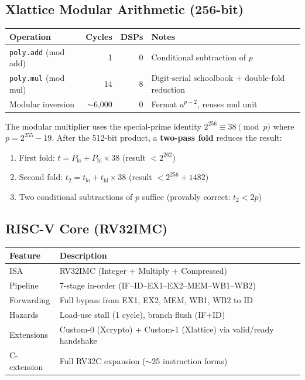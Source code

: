 \documentclass[11pt,a4paper]{article}
\begin{document}
\subsection{Xlattice Modular Arithmetic (256-bit)}

\begin{center}
\begin{tabular}{@{}lrrp{5cm}@{}}
\toprule
\textbf{Operation} & \textbf{Cycles} & \textbf{DSPs} & \textbf{Notes} \\
\midrule
\texttt{poly.add} (mod add) & 1 & 0 & Conditional subtraction of $p$ \\
\texttt{poly.mul} (mod mul) & 14 & 8 & Digit-serial schoolbook + double-fold reduction \\
Modular inversion & $\sim$6,000 & 0 & Fermat $a^{p-2}$, reuses mul unit \\
\bottomrule
\end{tabular}
\end{center}

\begin{keyinsight}
The modular multiplier uses the special-prime identity $2^{256} \equiv 38 \pmod{p}$ where $p = 2^{255} - 19$. After the 512-bit product, a \textbf{two-pass fold} reduces the result:
\begin{enumerate}[leftmargin=1.5em]
    \item First fold: $t = P_{\text{lo}} + P_{\text{hi}} \times 38$ (result $< 2^{262}$)
    \item Second fold: $t_2 = t_{\text{lo}} + t_{\text{hi}} \times 38$ (result $< 2^{256} + 1482$)
    \item Two conditional subtractions of $p$ suffice (provably correct: $t_2 < 2p$)
\end{enumerate}
\end{keyinsight}

\subsection{RISC-V Core (RV32IMC)}

\begin{center}
\begin{tabular}{@{}lp{10cm}@{}}
\toprule
\textbf{Feature} & \textbf{Description} \\
\midrule
ISA & RV32IMC (Integer + Multiply + Compressed) \\
Pipeline & 7-stage in-order (IF--ID--EX1--EX2--MEM--WB1--WB2) \\
Forwarding & Full bypass from EX1, EX2, MEM, WB1, WB2 to ID \\
Hazards & Load-use stall (1 cycle), branch flush (IF+ID) \\
Extensions & Custom-0 (Xcrypto) + Custom-1 (Xlattice) via valid/ready handshake \\
C-extension & Full RV32C expansion ($\sim$25 instruction forms) \\
\bottomrule
\end{tabular}
\end{center}
\end{document}
